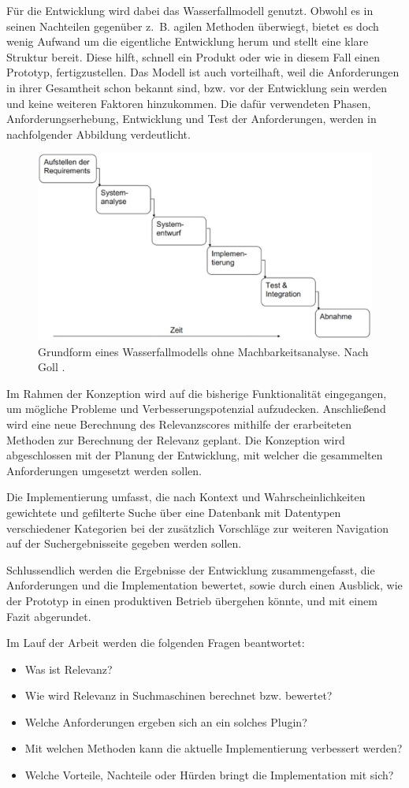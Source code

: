 Für die Entwicklung wird dabei das Wasserfallmodell genutzt.
Obwohl es in seinen Nachteilen gegenüber z. B. agilen Methoden überwiegt, bietet es doch wenig Aufwand um die eigentliche Entwicklung herum und stellt eine klare Struktur bereit.
Diese hilft, schnell ein Produkt oder wie in diesem Fall einen Prototyp, fertigzustellen.
Das Modell ist auch vorteilhaft, weil die Anforderungen in ihrer Gesamtheit schon bekannt sind, bzw. vor der Entwicklung sein werden und keine weiteren Faktoren hinzukommen. Die dafür verwendeten Phasen, Anforderungserhebung, Entwicklung und Test der Anforderungen, werden in nachfolgender Abbildung verdeutlicht.
\begin{figure}[h]
  \begin{centering}
    \includegraphics[width=.6\textwidth]{figures/intro/waterfall.png}
    \caption{Grundform eines Wasserfallmodells ohne Machbarkeitsanalyse. Nach Goll \cite{goll2011}.}
    \label{fig:waterfall}
  \end{centering}
\end{figure}

Im Rahmen der Konzeption wird auf die bisherige Funktionalität eingegangen, um mögliche Probleme und Verbesserungspotenzial aufzudecken. Anschließend wird eine neue Berechnung des Relevanzscores mithilfe der erarbeiteten Methoden zur Berechnung der Relevanz geplant. Die Konzeption wird abgeschlossen mit der Planung der Entwicklung, mit welcher die gesammelten Anforderungen umgesetzt werden sollen.

Die Implementierung umfasst, die nach Kontext und Wahrscheinlichkeiten gewichtete und gefilterte Suche über eine Datenbank mit Datentypen verschiedener Kategorien bei der zusätzlich Vorschläge zur weiteren Navigation auf der Suchergebnisseite gegeben werden sollen.

Schlussendlich werden die Ergebnisse der Entwicklung zusammengefasst, die Anforderungen und die Implementation bewertet, sowie durch einen Ausblick, wie der Prototyp in einen produktiven Betrieb übergehen könnte, und mit einem Fazit abgerundet.

Im Lauf der Arbeit werden die folgenden Fragen beantwortet:
\begin{itemize}
  \item Was ist Relevanz?
  \item Wie wird Relevanz in Suchmaschinen berechnet bzw. bewertet?
  \item Welche Anforderungen ergeben sich an ein solches Plugin?
  \item Mit welchen Methoden kann die aktuelle Implementierung verbessert werden?
  \item Welche Vorteile, Nachteile oder Hürden bringt die Implementation mit sich?
\end{itemize}
